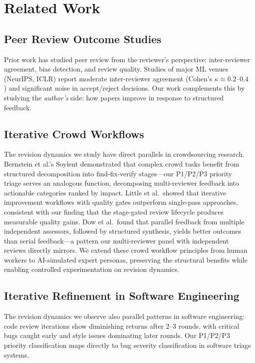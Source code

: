 \section{Related Work}

\subsection{Peer Review Outcome Studies}

Prior work has studied peer review from the reviewer's perspective: inter-reviewer agreement, bias detection, and review quality. Studies of major ML venues (NeurIPS, ICLR) report moderate inter-reviewer agreement (Cohen's $\kappa \approx 0.2$--$0.4$) and significant noise in accept/reject decisions. Our work complements this by studying the \emph{author's} side: how papers improve in response to structured feedback.

\subsection{Iterative Crowd Workflows}

The revision dynamics we study have direct parallels in crowdsourcing research. Bernstein et al.'s Soylent demonstrated that complex crowd tasks benefit from structured decomposition into find-fix-verify stages---our P1/P2/P3 priority triage serves an analogous function, decomposing multi-reviewer feedback into actionable categories ranked by impact. Little et al.\ showed that iterative improvement workflows with quality gates outperform single-pass approaches, consistent with our finding that the stage-gated review lifecycle produces measurable quality gains. Dow et al.\ found that parallel feedback from multiple independent assessors, followed by structured synthesis, yields better outcomes than serial feedback---a pattern our multi-reviewer panel with independent reviews directly mirrors. We extend these crowd workflow principles from human workers to AI-simulated expert personas, preserving the structural benefits while enabling controlled experimentation on revision dynamics.

\subsection{Iterative Refinement in Software Engineering}

The revision dynamics we observe also parallel patterns in software engineering: code review iterations show diminishing returns after 2--3 rounds, with critical bugs caught early and style issues dominating later rounds. Our P1/P2/P3 priority classification maps directly to bug severity classification in software triage systems.

